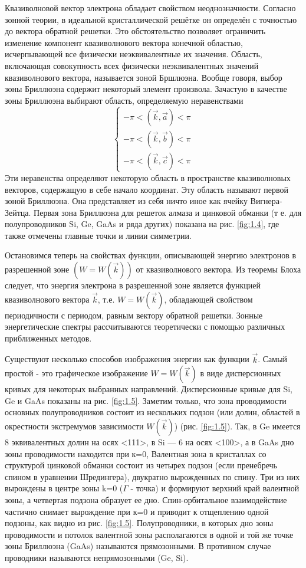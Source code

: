 Квазиволновой вектор электрона обладает свойством неоднозначности. Согласно зонной теории, в идеальной кристаллической
решётке он определён с точностью до вектора обратной решетки. Это обстоятельство позволяет ограничить изменение
компонент квазиволнового вектора конечной областью, исчерпывающей все физически неэквивалентные их значения. Область,
включающая совокупность всех физически неэквивалентных значений квазиволнового вектора, называется зоной Бршлюэна.
Вообще говоря, выбор зоны Бриллюэна содержит некоторый элемент произвола. Зачастую в качестве зоны Бриллюэна выбирают
область, определяемую неравенствами
\begin{equation}
	\left\{\begin{array}{l}{-\pi<(\vec{k}, \vec{a})<\pi} \\ {-\pi<(\vec{k}, \vec{b})<\pi} \\ {-\pi<(\vec{k}, \vec{c})<\pi}\end{array}\right.
	\label{eq:1.6}
\end{equation}
Эти неравенства определяют некоторую область в пространстве квазиволновых векторов, содержащую в себе начало координат.
Эту область называют первой зоной Бриллюэна. Она представляет из себя ничто иное как ячейку Вигнера-Зейтца. Первая зона
Бриллюэна для решеток алмаза и цинковой обманки (т е. для полупроводников Si, Ge, GaAs и ряда других) показана на рис.
\ref{fig:1.4}, где также отмечены главные точки и линии симметрии.

Остановимся теперь на свойствах функции, описывающей энергию электронов в разрешенной зоне $(W=W(\vec{k}))$ от квазиволнового
вектора. Из теоремы Блоха следует, что энергия электрона в разрешенной зоне является функцией квазиволнового вектора $\vec{k}$,
т.е. $W=W(\vec{k})$, обладающей свойством периодичности с периодом, равным вектору обратной решетки. Зонные энергетические
спектры рассчитываются теоретически с помощью различных приближенных методов.

Существуют несколько способов изображения энергии как функции $\vec{k}$. Самый простой - это графическое изображение $W=W(\vec{k})$ в
виде дисперсионных кривых для некоторых выбранных направлений. Дисперсионные кривые для Si, Ge и GaAs показаны на рис.
\ref{fig:1.5}. Заметим только, что зона проводимости основных полупроводников состоит из нескольких подзон (или долин, областей в
окрестности экстремумов зависимости  $W(\vec{k})$) (рис. \ref{fig:1.5}). Так, в Ge имеется 8 эквивалентных долин на осях <111>, в Si — 6 на
осях <100>, а в GaAs дно зоны проводимости находится при к=0, Валентная зона в кристаллах со структурой цинковой обманки
состоит из четырех подзон (если пренебречь спином в уравнении Шредингера), двукратно вырожденных по спину. Три из них
вырождены в центре зоны k=0 ($\Gamma$ - точка) и формируют верхний край валентной зоны, а четвертая подзона образует ее дно.
Спин-орбитальное взаимодействие частично снимает вырождение при к=0 и приводит к отщеплению одной подзоны, как видно из
рис. \ref{fig:1.5}. Полупроводники, в которых дно зоны проводимости и потолок валентной зоны располагаются в одной и той же точке
зоны Бриллюэна (GaAs) называются прямозонными. В противном случае проводники называются непрямозонными (Ge, Si).

